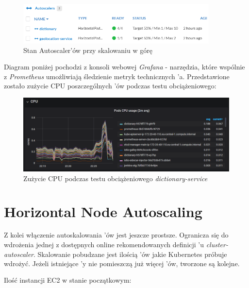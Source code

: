 \begin{figure}[!ht]
	\begin{center}
		\includegraphics[width=0.9\textwidth]{img/autoscaling/hpa-autoscalers-scale-up}
	\end{center}
    \caption{Stan Autoscaler'ów przy skalowaniu w górę}
\end{figure}

Diagram poniżej pochodzi z konsoli webowej \emph{Grafana} - narzędzia, które wspólnie z \emph{Prometheus} umożliwiają śledzienie metryk technicznych 'a.
Przedstawione zostało zużycie CPU poszczególnych 'ów podczas testu obciążeniowego:

\begin{figure}[!ht]
	\begin{center}
		\includegraphics[width=1\textwidth]{img/autoscaling/hpa-grafana-scale-up}
	\end{center}
    \caption{Zużycie CPU podczas testu obciążeniowego \emph{dictionary-service}}
\end{figure}

\section{Horizontal Node Autoscaling}

Z kolei włączenie autoskalowania 'ów jest jeszcze prostsze. 
Ogranicza się do wdrożenia jednej z dostępnych online rekomendowanych definicji 'u \emph{cluster-autoscaler}.
Skalowanie pobudzane jest ilością 'ów jakie Kubernetes próbuje wdrożyć.
Jeżeli istniejące 'y nie pomieszczą już więcej 'ów, tworzone są kolejne.

Ilość instancji EC2 w stanie początkowym:


